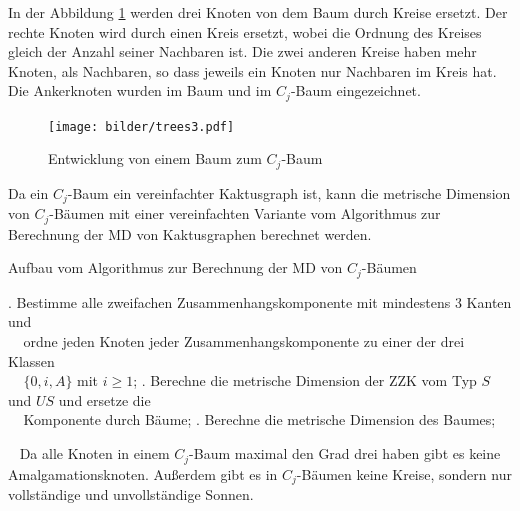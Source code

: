 \begin{bsp}
In der Abbildung \ref{c_jbaum} werden drei Knoten von dem Baum durch Kreise ersetzt. Der rechte Knoten wird durch einen Kreis ersetzt, wobei die Ordnung des Kreises gleich der Anzahl seiner Nachbaren ist. Die zwei anderen Kreise haben mehr Knoten, als Nachbaren, so dass jeweils ein Knoten nur Nachbaren im Kreis hat. Die Ankerknoten wurden im Baum und im $C_j$-Baum eingezeichnet.\\
\vspace{-4mm}
\begin{figure}[h!]
		\centering 		 
   \texttt{[image: bilder/trees3.pdf]}
	\caption{Entwicklung von einem Baum zum $C_{j}$-Baum}
	\label{c_jbaum}
  	 \end{figure}
\vspace{-4mm}
\end{bsp}
\begin{bem}
Da ein $C_j$-Baum ein vereinfachter Kaktusgraph ist, kann die metrische Dimension von $C_j$-Bäumen mit einer vereinfachten Variante vom Algorithmus zur Berechnung der MD von Kaktusgraphen berechnet werden.
\begin{algorithm}
\caption{Aufbau vom Algorithmus zur Berechnung der MD von $C_j$-Bäumen}
\begin{algorithmic}
. Bestimme alle zweifachen Zusammenhangskomponente mit mindestens 3 Kanten und\\$\;\;\;\;$ordne jeden Knoten jeder Zusammenhangskomponente zu einer der drei Klassen\\$\;\;\;\;\{0,i,A\}$ mit $i \geq 1$;
. Berechne die metrische Dimension der ZZK vom Typ $S$ und $US$ und ersetze die\\$\;\;\;\;$Komponente durch Bäume;
. Berechne die metrische Dimension des Baumes;
\end{algorithmic}
\end{algorithm}
~\linebreak
Da alle Knoten in einem $C_j$-Baum maximal den Grad drei haben gibt es keine Amalgamationsknoten. Außerdem gibt es in $C_j$-Bäumen keine Kreise, sondern nur vollständige und unvollständige Sonnen.
\end{bem}
